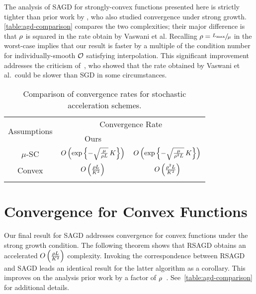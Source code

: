 The analysis of \ac{SAGD} for strongly-convex functions presented here is strictly tighter than prior work by \citet[Theorem 1]{vaswani2019fast}, who also studied convergence under strong growth.
\autoref{table:agd-comparison} compares the two complexities; their major difference is that \( \sgc \) is squared in the rate obtain by Vaswani et al. 
Recalling \( \sgc = \sfrac{\Lmax}{\mu} \) in the worst-case implies that our result is faster by a multiple of the condition number for individually-smooth \( \oracle{} \) satisfying interpolation.
This significant improvement addresses the criticism of~\citet{liu2020accelerating}, who showed that the rate obtained by Vaswani et al.\ could be slower than \ac{SGD} in some circumstances. 

\begin{table}[t]
    \centering
    \begin{tabular}{c c c  }\toprule
        \multirow{2}{*}{Assumptions} & \multicolumn{2}{c}{Convergence Rate}\\%
        \cmidrule(lr){2-3} 
                 & \multicolumn{1}{c}{Ours} & \multicolumn{1}{c}{\citet{vaswani2019painless}}\\ \midrule
        \( \mu \)-SC & \( O\rbr{\exp\cbr{- \sqrt{\frac{\mu}{\sgc L}} \, K}} \)%
                     & \( O\rbr{\exp\cbr{- \sqrt{\frac{\mu}{\sgc^2 L}} \, K}} \) \\ \addlinespace
        Convex       & \( O\rbr{\frac{\sgc L}{K^2}} \)%
                 & \( O\rbr{\frac{\sgc^2 L}{K^2}} \)\\ \addlinespace 
        \end{tabular}
        \caption{Comparison of convergence rates for stochastic acceleration schemes.}%
    \label{table:agd-comparison}
\end{table}

\section{Convergence for Convex Functions}\label{sec:agd-convex}

Our final result for \ac{SAGD} addresses convergence for convex functions under the strong growth condition. 
The following theorem shows that \ac{RSAGD} obtains an accelerated \( O\rbr{\frac{\sgc L}{K^2}} \) complexity.
Invoking the correspondence between \ac{RSAGD} and \ac{SAGD} leads an identical result for the latter algorithm as a corollary.
This improves on the analysis prior work by a factor of \( \sgc \)~\citep[Theorem 2]{vaswani2019fast}. 
See~\autoref{table:agd-comparison} for additional details.

